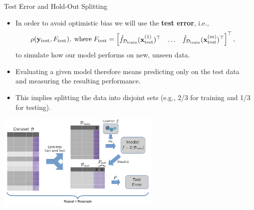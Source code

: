 \begin{vbframe}{Test Error and Hold-Out Splitting}

  \small
\begin{itemize}
  \item In order to avoid optimistic bias we will use the 
  \textbf{test error}, i.e.,
$$\rho(\yv_{\mathrm{test}}, F_{\textrm{test}}), \;\text{where}\; F_{\textrm{test}} = 
\begin{bmatrix} \fhDtrain(\xi[1]_{\textrm{test}})^\top & \dots & \fhDtrain(\xi[m]_{\textrm{test}})^\top \end{bmatrix}^\top,$$ 
  to simulate how our model performs on new, unseen data.
  \item Evaluating a given model therefore means predicting only on the
  test data and measuring the resulting performance.
  \item This implies splitting the data into disjoint sets (e.g., 2/3 for 
  training and 1/3 for testing).
\end{itemize}

\begin{center}

  \includegraphics[width=0.6\textwidth]{figure_man/test_error.pdf}

\end{center}

\end{vbframe}

